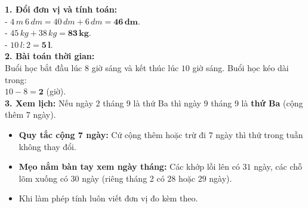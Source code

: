 \documentclass[10pt,a4paper]{article}
\begin{document}
\vspace{-1.5mm}
\noindent
\begin{minipage}[t]{0.49\textwidth}\vspace{0pt}
\begin{tcolorbox}[
  enhanced,
  colback=green!4!white,
  colframe=green!60!black,
  arc=2mm, boxrule=0.8pt,
  left=2mm, right=2mm, top=1.8mm, bottom=1.8mm,
  title={\footnotesize\bfseries\color{white}\faCheckCircle\ 4. Bài tập thực hành mẫu}
]
{\footnotesize
\textbf{1. Đổi đơn vị và tính toán:}\\
- $4\,m\ 6\,dm = 40\,dm + 6\,dm = \mathbf{46\,dm}$.\\
- $45\,kg + 38\,kg = \mathbf{83\,kg}$.\\
- $10\,l : 2 = \mathbf{5\,l}$.\\
\textbf{2. Bài toán thời gian:}\\
Buổi học bắt đầu lúc $8$ giờ sáng và kết thúc lúc $10$ giờ sáng. Buổi học kéo dài trong:\\
$10 - 8 = \mathbf{2}$ (giờ).\\
\textbf{3. Xem lịch:} Nếu ngày $2$ tháng 9 là thứ Ba thì ngày $9$ tháng 9 là \textbf{thứ Ba} (cộng thêm $7$ ngày).
}
\end{tcolorbox}
\end{minipage}
\hfill
\begin{minipage}[t]{0.49\textwidth}\vspace{0pt}
\begin{tcolorbox}[
  enhanced,
  colback=rose!4!white,
  colframe=rose!70!black,
  arc=2mm, boxrule=0.8pt,
  left=2mm, right=2mm, top=1.8mm, bottom=1.8mm,
  title={\footnotesize\bfseries\color{white}\faExclamationTriangle\ 5. Cạm bẫy \& Mẹo xem lịch}
]
{\footnotesize
\begin{itemize}\setlength{\itemsep}{1.5pt}\setlength{\leftskip}{-2.5mm}
  \item \textbf{Quy tắc cộng 7 ngày:} Cứ cộng thêm hoặc trừ đi $7$ ngày thì thứ trong tuần không thay đổi.
  \item \textbf{Mẹo nắm bàn tay xem ngày tháng:} Các khớp lồi lên có $31$ ngày, các chỗ lõm xuống có $30$ ngày (riêng tháng 2 có $28$ hoặc $29$ ngày).
  \item Khi làm phép tính luôn viết đơn vị đo kèm theo.
\end{itemize}
}
\end{tcolorbox}
\end{minipage}
\end{document}
